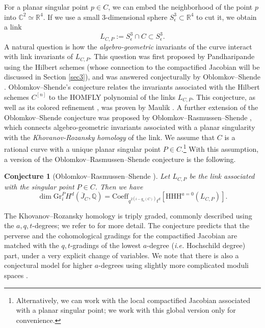 \documentclass{pspum-l}
\theoremstyle{plain}
\newtheorem{conj}[thm]{Conjecture}
\theoremstyle{definition}
\theoremstyle{remark}
\newcommand{\BC}{{\mathbb{C}}}
\newcommand{\BQ}{{\mathbb{Q}}}
\newcommand{\BR}{{\mathbb{R}}}
\begin{document}
For a planar singular point $p \in C$, we can embed the neighborhood of the point $p$ into $\BC^2 \simeq \BR^4$. If we use a small 3-dimensional sphere $S^3_\epsilon \subset \BR^4$ to cut it, we obtain a link  
\[
L_{C,P}:= S^3_\epsilon \cap C \subset  S^3_{\epsilon}.
\]
A natural question is how the \emph{algebro-geometric} invariants of the curve interact with link invariants of $L_{C,P}$. This question was first proposed by Pandharipande using the Hilbert schemes (whose connection to the compactified Jacobian will be discussed in Section \ref{sec3}), and was answered conjecturally by Oblomkov--Shende \cite{OS}. Oblomkov--Shende's conjecture relates the invariants associated with the Hilbert schemes $C^{[n]}$ to the HOMFLY polynomial of the links $L_{C,P}$. This conjecture, as well as its colored refinement \cite{DHS}, was proven by Maulik \cite{Ma}. A further extension of the Oblomkov--Shende conjecture was proposed by Oblomkov--Rasmussen--Shende \cite{ORS}, which connects algebro-geometric invariants associated with a planar singularity with the \emph{Khovanov-Rozansky homology} \cite{KR} of the link. We assume that $C$ is a rational curve with a unique planar singular point $P \in C$.\footnote{Alternatively, we can work with the local compactified Jacobian associated with a planar singular point; we work with this global version only for convenience.} With this assumption, a version of the Oblomkov--Rasmussen--Shende conjecture is the following.








\begin{conj}[Oblomkov--Rasmussen--Shende \cite{ORS}]\label{Conj_ORS}
Let $L_{C,P}$ be the link associated with the singular point $P\in C$. Then we have
    \begin{equation}\label{ORS_eq}
\dim    \mathrm{Gr}^P_i H^d(\overline{J}_C, \BQ) = \mathrm{Coeff}_{q^{2(i-g_a(C))}t^d} \left[\mathrm{HHH}^{a=0}(L_{C,P}) \right].
    \end{equation}
\end{conj}
The Khovanov–Rozansky homology is triply graded, commonly described using the $a,q,t$-degrees; we refer to \cite{GKS} for more detail. The conjecture predicts that the perverse and the cohomological gradings for the compactified Jacobian are matched with the $q,t$-gradings of the lowest $a$-degree (\emph{i.e.} Hochschild degree) part, under a very explicit change of variables. We note that there is also a conjectural model for higher $a$-degrees using slightly more complicated moduli spaces \cite{ORS}.
\end{document}
